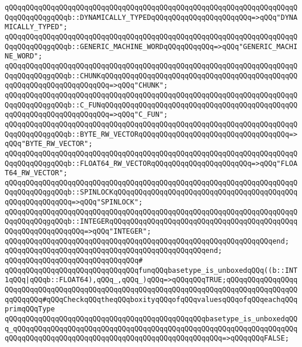 \verb|qQQqqQQqqQQqqQQqqQQqqQQqqQQqqQQqqQQqqQQqqQQqqQQqqQQqqQQqqQQqqQQqqQQqqQQqqQQqqQQqgqQQqb::DYNAMICALLY_TYPEDqQQqqQQqqQQqqQQqqQQqqQQq=>qQQq"DYNAMICALLY_TYPED";|\newline
\verb|qQQqqQQqqQQqqQQqqQQqqQQqqQQqqQQqqQQqqQQqqQQqqQQqqQQqqQQqqQQqqQQqqQQqqQQqqQQqqQQqgqQQqb::GENERIC_MACHINE_WORDqQQqqQQqqQQq=>qQQq"GENERIC_MACHINE_WORD";|\newline
\verb|qQQqqQQqqQQqqQQqqQQqqQQqqQQqqQQqqQQqqQQqqQQqqQQqqQQqqQQqqQQqqQQqqQQqqQQqqQQqqQQqgqQQqb::CHUNKqQQqqQQqqQQqqQQqqQQqqQQqqQQqqQQqqQQqqQQqqQQqqQQqqQQqqQQqqQQqqQQqqQQqqQQq=>qQQq"CHUNK";|\newline
\verb|qQQqqQQqqQQqqQQqqQQqqQQqqQQqqQQqqQQqqQQqqQQqqQQqqQQqqQQqqQQqqQQqqQQqqQQqqQQqqQQqgqQQqb::C_FUNqQQqqQQqqQQqqQQqqQQqqQQqqQQqqQQqqQQqqQQqqQQqqQQqqQQqqQQqqQQqqQQqqQQqqQQq=>qQQq"C_FUN";|\newline
\verb|qQQqqQQqqQQqqQQqqQQqqQQqqQQqqQQqqQQqqQQqqQQqqQQqqQQqqQQqqQQqqQQqqQQqqQQqqQQqqQQqgqQQqb::BYTE_RW_VECTORqQQqqQQqqQQqqQQqqQQqqQQqqQQqqQQqqQQq=>qQQq"BYTE_RW_VECTOR";|\newline
\verb|qQQqqQQqqQQqqQQqqQQqqQQqqQQqqQQqqQQqqQQqqQQqqQQqqQQqqQQqqQQqqQQqqQQqqQQqqQQqqQQqgqQQqb::FLOAT64_RW_VECTORqQQqqQQqqQQqqQQqqQQqqQQq=>qQQq"FLOAT64_RW_VECTOR";|\newline
\verb|qQQqqQQqqQQqqQQqqQQqqQQqqQQqqQQqqQQqqQQqqQQqqQQqqQQqqQQqqQQqqQQqqQQqqQQqqQQqqQQqgqQQqb::SPINLOCKqQQqqQQqqQQqqQQqqQQqqQQqqQQqqQQqqQQqqQQqqQQqqQQqqQQqqQQqqQQq=>qQQq"SPINLOCK";|\newline
\verb|qQQqqQQqqQQqqQQqqQQqqQQqqQQqqQQqqQQqqQQqqQQqqQQqqQQqqQQqqQQqqQQqqQQqqQQqqQQqqQQqgqQQqb::INTEGERqQQqqQQqqQQqqQQqqQQqqQQqqQQqqQQqqQQqqQQqqQQqqQQqqQQqqQQqqQQqqQQq=>qQQq"INTEGER";|\newline
\verb|qQQqqQQqqQQqqQQqqQQqqQQqqQQqqQQqqQQqqQQqqQQqqQQqqQQqqQQqqQQqqQQqend;|\newline
\verb|qQQqqQQqqQQqqQQqqQQqqQQqqQQqqQQqqQQqqQQqqQQqqQQqend;|\newline
\newline
\verb|qQQqqQQqqQQqqQQqqQQqqQQqqQQqqQQq#|\newline
\verb|qQQqqQQqqQQqqQQqqQQqqQQqqQQqqQQqfunqQQqbasetype_is_unboxedqQQq((b::INT1qQQq|\verb#|qQQqb::FLOAT64),qQQq_,qQQq_)qQQq=>qQQqqQQqTRUE;qQQqqQQqqQQqqQQqqQQqqQQqqQQqqQQqqQQqqQQqqQQqqQQqqQQqqQQqqQQqqQQqqQQqqQQqqQQqqQQqqQQqqQQqqQQqqQQq#\verb|#qQQqCheckqQQqtheqQQqboxityqQQqofqQQqvaluesqQQqofqQQqeachqQQqprimqQQqType|\newline
\verb|qQQqqQQqqQQqqQQqqQQqqQQqqQQqqQQqqQQqqQQqqQQqqQQqbasetype_is_unboxedqQQq_qQQqqQQqqQQqqQQqqQQqqQQqqQQqqQQqqQQqqQQqqQQqqQQqqQQqqQQqqQQqqQQqqQQqqQQqqQQqqQQqqQQqqQQqqQQqqQQqqQQqqQQqqQQqqQQqqQQqqQQq=>qQQqqQQqFALSE;|\newline
